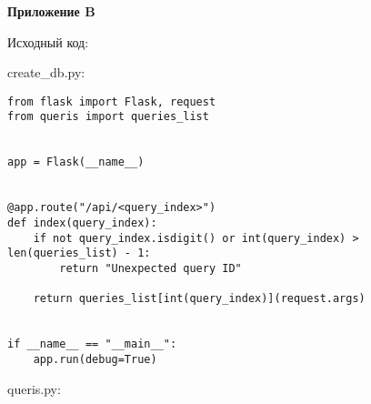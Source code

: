\documentclass{article}
\begin{document}
\textbf{Приложение B}

Исходный код:

create\_db.py:

{\normalsize
\begin{verbatim}
from flask import Flask, request
from queris import queries_list


app = Flask(__name__)


@app.route("/api/<query_index>")
def index(query_index):
    if not query_index.isdigit() or int(query_index) > len(queries_list) - 1:
        return "Unexpected query ID"

    return queries_list[int(query_index)](request.args)


if __name__ == "__main__":
    app.run(debug=True)
\end{verbatim}
}

queris.py:
\end{document}
